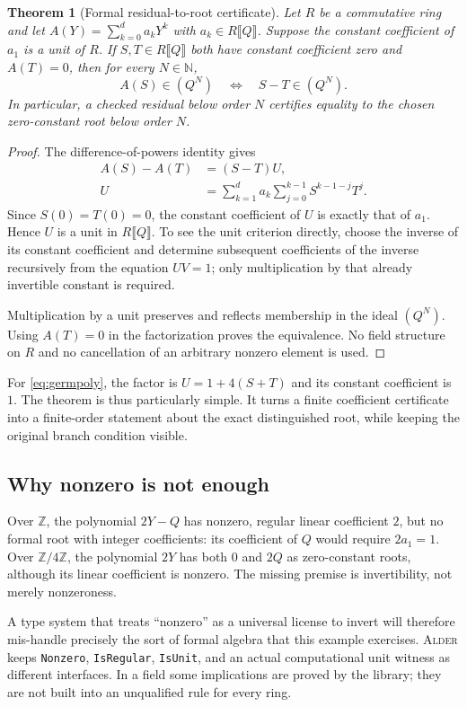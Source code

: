 \documentclass[11pt,a4paper]{article}
\newcommand{\code}[1]{\nolinkurl{#1}}
\newcommand{\Alder}{\textsc{Alder}}
\newcommand{\N}{\mathbb N}\newcommand{\Z}{\mathbb Z}\newcommand{\Q}{\mathbb Q}\newcommand{\R}{\mathbb R}
\theoremstyle{plain}
\newtheorem{theorem}{Theorem}[section]
\theoremstyle{definition}
\theoremstyle{remark}
\begin{document}
\begin{theorem}[Formal residual-to-root certificate]\label{thm:residualroot}
Let $R$ be a commutative ring and let $A(Y)=\sum_{k=0}^d a_kY^k$ with $a_k\in R\llbracket Q\rrbracket$. Suppose the constant coefficient of $a_1$ is a unit of $R$. If $S,T\in R\llbracket Q\rrbracket$ both have constant coefficient zero and $A(T)=0$, then for every $N\in\N$,
\[
 A(S)\in(Q^N)\quad\Longleftrightarrow\quad S-T\in(Q^N).
\]
In particular, a checked residual below order $N$ certifies equality to the chosen zero-constant root below order $N$.
\end{theorem}
\begin{proof}
The difference-of-powers identity gives
\begin{align*}
 A(S)-A(T)&=(S-T)U,\\
 U&=\sum_{k=1}^d a_k\sum_{j=0}^{k-1}S^{k-1-j}T^j.
\end{align*}
Since $S(0)=T(0)=0$, the constant coefficient of $U$ is exactly that of $a_1$. Hence $U$ is a unit in $R\llbracket Q\rrbracket$. To see the unit criterion directly, choose the inverse of its constant coefficient and determine subsequent coefficients of the inverse recursively from the equation $UV=1$; only multiplication by that already invertible constant is required.

Multiplication by a unit preserves and reflects membership in the ideal $(Q^N)$. Using $A(T)=0$ in the factorization proves the equivalence. No field structure on $R$ and no cancellation of an arbitrary nonzero element is used.
\end{proof}
For \eqref{eq:germpoly}, the factor is $U=1+4(S+T)$ and its constant coefficient is $1$. The theorem is thus particularly simple. It turns a finite coefficient certificate into a finite-order statement about the exact distinguished root, while keeping the original branch condition visible.

\subsection{Why nonzero is not enough}
Over $\Z$, the polynomial $2Y-Q$ has nonzero, regular linear coefficient $2$, but no formal root with integer coefficients: its coefficient of $Q$ would require $2a_1=1$. Over $\Z/4\Z$, the polynomial $2Y$ has both $0$ and $2Q$ as zero-constant roots, although its linear coefficient is nonzero. The missing premise is invertibility, not merely nonzeroness.

A type system that treats ``nonzero'' as a universal license to invert will therefore mis-handle precisely the sort of formal algebra that this example exercises. \Alder{} keeps \code{Nonzero}, \code{IsRegular}, \code{IsUnit}, and an actual computational unit witness as different interfaces. In a field some implications are proved by the library; they are not built into an unqualified rule for every ring.
\end{document}
